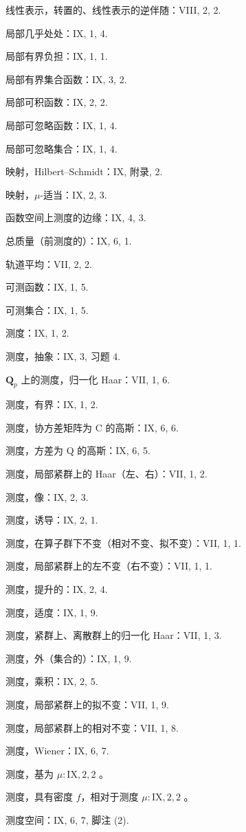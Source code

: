 线性表示，转置的、线性表示的逆伴随：VIII, 2, 2.

局部几乎处处：IX, 1, 4.

局部有界负担：IX, 1, 1.

局部有界集合函数：IX, 3, 2.

局部可积函数：IX, 2, 2.

局部可忽略函数：IX, 1, 4.

局部可忽略集合：IX, 1, 4.

映射，Hilbert--Schmidt：IX, 附录, 2.

映射，\(\mu\)-适当：IX, 2, 3.

函数空间上测度的边缘：IX, 4, 3.

总质量（前测度的）：IX, 6, 1.

轨道平均：VII, 2, 2.

可测函数：IX, 1, 5.

可测集合：IX, 1, 5.

测度：IX, 1, 2.

测度，抽象：IX, 3, 习题 4.

\(\mathbf{Q}_p\) 上的测度，归一化 Haar：VII, 1, 6.

测度，有界：IX, 1, 2.

测度，协方差矩阵为 C 的高斯：IX, 6, 6.

测度，方差为 Q 的高斯：IX, 6, 5.

测度，局部紧群上的 Haar（左、右）：VII, 1, 2.

测度，像：IX, 2, 3.

测度，诱导：IX, 2, 1.

测度，在算子群下不变（相对不变、拟不变）：VII, 1, 1.

测度，局部紧群上的左不变（右不变）：VII, 1, 1.

测度，提升的：IX, 2, 4.

测度，适度：IX, 1, 9.

测度，紧群上、离散群上的归一化 Haar：VII, 1, 3.

测度，外（集合的）：IX, 1, 9.

测度，乘积：IX, 2, 5.

测度，局部紧群上的拟不变：VII, 1, 9.

测度，局部紧群上的相对不变：VII, 1, 8.

测度，Wiener：IX, 6, 7.

测度，基为 \(\mu : \mathrm{IX}, 2, 2\) 。

测度，具有密度 \(f\)，相对于测度 \(\mu: \mathrm{IX}, 2, 2\) 。

测度空间：IX, 6, 7, 脚注 (2).

